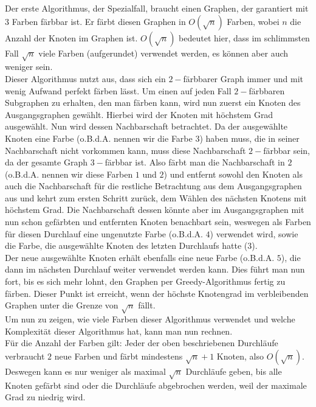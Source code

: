 \documentclass[11pt]{article}
\begin{document}
Der erste Algorithmus, der Spezialfall, braucht einen Graphen, der garantiert mit $3$ Farben färbbar ist.
Er färbt diesen Graphen in $O(\sqrt{n})$ Farben, wobei $n$ die Anzahl der Knoten im Graphen ist. $O(\sqrt{n})$ bedeutet hier,
dass im schlimmsten Fall $\sqrt{n}$ viele Farben (aufgerundet) verwendet werden, es können aber auch weniger sein. \\
Dieser Algorithmus nutzt aus, dass sich ein $2-$färbbarer Graph immer und mit wenig Aufwand perfekt färben lässt. %
Um einen auf jeden Fall $2-$färbbaren Subgraphen zu erhalten, den man färben kann, wird nun zuerst ein Knoten des
Ausgangsgraphen gewählt. Hierbei wird der Knoten mit höchstem Grad ausgewählt. Nun wird dessen Nachbarschaft %
betrachtet. Da der ausgewählte Knoten eine Farbe (o.B.d.A. nennen wir die Farbe $3$) haben muss, die in seiner Nachbarschaft nicht vorkommen kann, muss diese Nachbarschaft
$2-$färbbar sein, da der gesamte Graph $3-$färbbar ist. Also färbt man die Nachbarschaft in $2$ (o.B.d.A. nennen wir diese Farben $1$ und $2$) und entfernt sowohl den Knoten
als auch die Nachbarschaft für die restliche Betrachtung aus dem Ausgangsgraphen aus und kehrt zum ersten Schritt zurück, dem Wählen
des nächsten Knotens mit höchstem Grad. Die Nachbarschaft dessen könnte aber im Ausgangsgraphen mit nun schon
gefärbten und entfernten Knoten benachbart sein, weswegen als Farben für diesen Durchlauf eine ungenutzte Farbe (o.B.d.A. $4$) verwendet wird, sowie die Farbe, die ausgewählte Knoten des letzten Durchlaufs hatte ($3$). \\
Der neue ausgewählte Knoten erhält ebenfalls eine neue Farbe (o.B.d.A. $5$), die dann im nächsten Durchlauf weiter verwendet werden kann.
Dies führt man nun fort, bis es sich mehr lohnt, den Graphen per Greedy-Algorithmus fertig zu färben. 
Dieser Punkt ist erreicht, wenn der höchste Knotengrad im verbleibenden Graphen unter die Grenze von $\sqrt{n}$ fällt. \\
Um nun zu zeigen, wie viele Farben dieser Algorithmus verwendet und welche Komplexität dieser Algorithmus hat, kann man nun rechnen. \\
Für die Anzahl der Farben gilt: Jeder der oben beschriebenen Durchläufe verbraucht $2$ neue Farben und färbt mindestens $\sqrt{n}+1$ Knoten, also $O(\sqrt{n})$.
Deswegen kann es nur weniger als maximal $\sqrt{n}$ Durchläufe geben, bis alle Knoten gefärbt sind oder die Durchläufe abgebrochen werden, weil der maximale Grad zu niedrig wird.
\end{document}
